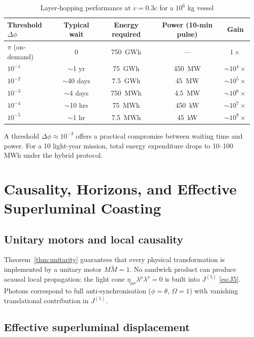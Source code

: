\documentclass[dvipdfmx,a4paper]{article}
\theoremstyle{definition}
\begin{document}
\begin{table}[ht]
\centering
\caption{Layer-hopping performance at $v=0.3c$ for a $10^6$ kg vessel}
\label{tab:layerhop}
\begin{tabular}{@{}lcccc@{}}
\toprule
Threshold $\Delta\phi$ & Typical wait & Energy required & Power (10-min pulse) & Gain \\
\midrule
$\pi$ (on-demand) & 0 & \qty{750}{GWh} & --- & $1\times$ \\
$10^{-1}$ & $\sim$1 yr & \qty{75}{GWh} & \qty{450}{MW} & $\sim 10^4\times$ \\
$10^{-2}$ & $\sim$40 days & \qty{7.5}{GWh} & \qty{45}{MW} & $\sim 10^5\times$ \\
$10^{-3}$ & $\sim$4 days & \qty{750}{MWh} & \qty{4.5}{MW} & $\sim 10^6\times$ \\
$10^{-4}$ & $\sim$10 hrs & \qty{75}{MWh} & \qty{450}{kW} & $\sim 10^7\times$ \\
$10^{-5}$ & $\sim$1 hr & \qty{7.5}{MWh} & \qty{45}{kW} & $\sim 10^8\times$ \\
\bottomrule
\end{tabular}
\end{table}

A threshold $\Delta\phi\approx 10^{-3}$ offers a practical compromise between waiting time and power. For a 10 light-year mission, total energy expenditure drops to 10--100 MWh under the hybrid protocol.

\section{Causality, Horizons, and Effective Superluminal Coasting}
\label{sec:causality}

\subsection{Unitary motors and local causality}

Theorem~\ref{thm:unitarity} guarantees that every physical transformation is implemented by a unitary motor $M\widetilde{M}=1$. No sandwich product can produce acausal local propagation: the light cone $\eta_{\mu\nu}\lambda^\mu\lambda^\nu=0$ is built into $J^{(5)}$ \eqref{eq:J5}. Photons correspond to full anti-synchronisation ($\phi=\theta$, $\Omega=1$) with vanishing translational contribution in $J^{(5)}$.

\subsection{Effective superluminal displacement}
\end{document}

